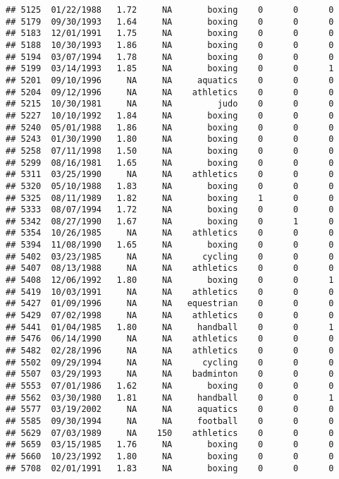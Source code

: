 \documentclass[]{article}
\begin{document}
\begin{verbatim}
## 5125  01/22/1988   1.72     NA       boxing    0      0      0
## 5179  09/30/1993   1.64     NA       boxing    0      0      0
## 5183  12/01/1991   1.75     NA       boxing    0      0      0
## 5188  10/30/1993   1.86     NA       boxing    0      0      0
## 5194  03/07/1994   1.78     NA       boxing    0      0      0
## 5199  03/14/1993   1.85     NA       boxing    0      0      1
## 5201  09/10/1996     NA     NA     aquatics    0      0      0
## 5204  09/12/1996     NA     NA    athletics    0      0      0
## 5215  10/30/1981     NA     NA         judo    0      0      0
## 5227  10/10/1992   1.84     NA       boxing    0      0      0
## 5240  05/01/1988   1.86     NA       boxing    0      0      0
## 5243  01/30/1990   1.80     NA       boxing    0      0      0
## 5258  07/11/1998   1.50     NA       boxing    0      0      0
## 5299  08/16/1981   1.65     NA       boxing    0      0      0
## 5311  03/25/1990     NA     NA    athletics    0      0      0
## 5320  05/10/1988   1.83     NA       boxing    0      0      0
## 5325  08/11/1989   1.82     NA       boxing    1      0      0
## 5333  08/07/1994   1.72     NA       boxing    0      0      0
## 5342  08/27/1990   1.67     NA       boxing    0      1      0
## 5354  10/26/1985     NA     NA    athletics    0      0      0
## 5394  11/08/1990   1.65     NA       boxing    0      0      0
## 5402  03/23/1985     NA     NA      cycling    0      0      0
## 5407  08/13/1988     NA     NA    athletics    0      0      0
## 5408  12/06/1992   1.80     NA       boxing    0      0      1
## 5419  10/03/1991     NA     NA    athletics    0      0      0
## 5427  01/09/1996     NA     NA   equestrian    0      0      0
## 5429  07/02/1998     NA     NA    athletics    0      0      0
## 5441  01/04/1985   1.80     NA     handball    0      0      1
## 5476  06/14/1990     NA     NA    athletics    0      0      0
## 5482  02/28/1996     NA     NA    athletics    0      0      0
## 5502  09/29/1994     NA     NA      cycling    0      0      0
## 5507  03/29/1993     NA     NA    badminton    0      0      0
## 5553  07/01/1986   1.62     NA       boxing    0      0      0
## 5562  03/30/1980   1.81     NA     handball    0      0      1
## 5577  03/19/2002     NA     NA     aquatics    0      0      0
## 5585  09/30/1994     NA     NA     football    0      0      0
## 5629  07/03/1989     NA    150    athletics    0      0      0
## 5659  03/15/1985   1.76     NA       boxing    0      0      0
## 5660  10/23/1992   1.80     NA       boxing    0      0      0
## 5708  02/01/1991   1.83     NA       boxing    0      0      0

\end{verbatim}
\end{document}
